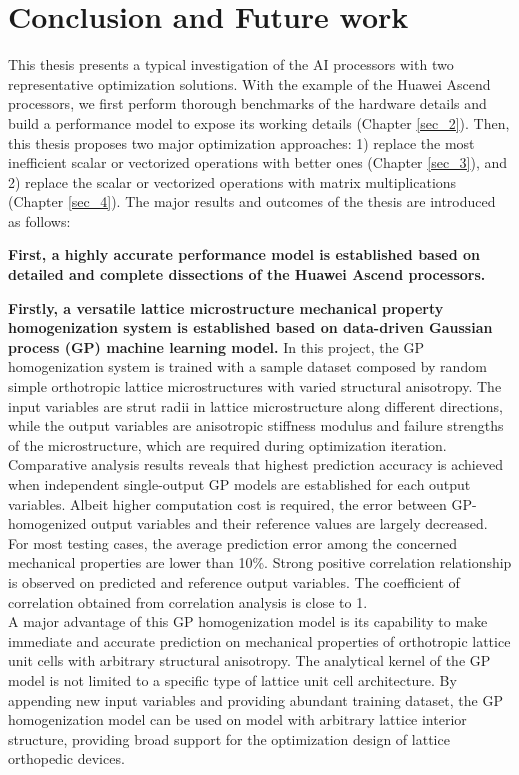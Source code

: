 \documentclass[12pt]{extbook}
\begin{document}
\chapter{Conclusion and Future work}
\label{sec_5}

This thesis presents a typical investigation of the AI processors with two representative optimization solutions. With the example of the Huawei Ascend processors, we first perform thorough benchmarks of the hardware details and build a performance model to expose its working details (Chapter \ref{sec_2}). Then, this thesis proposes two major optimization approaches: 1) replace the most inefficient scalar or vectorized operations with better ones (Chapter \ref{sec_3}), and 2) replace the scalar or vectorized operations with matrix multiplications (Chapter \ref{sec_4}). The major results and outcomes of the thesis are introduced as follows:

\textbf{First, a highly accurate performance model is established based on detailed and complete dissections of the Huawei Ascend processors.} 


{\bf Firstly, a versatile lattice microstructure mechanical property homogenization system is established based on data-driven Gaussian process (GP) machine learning model.} In this project, the GP homogenization system is trained with a sample dataset composed by random simple orthotropic lattice microstructures with varied structural anisotropy. The input variables are strut radii in lattice microstructure along different directions, while the output variables are anisotropic stiffness modulus and failure strengths of the microstructure, which are required during optimization iteration.\\

Comparative analysis results reveals that highest prediction accuracy is achieved when independent single-output GP models are established for each output variables. Albeit higher computation cost is required, the error between GP-homogenized output variables and their reference values are largely decreased. For most testing cases, the average prediction error among the concerned mechanical properties are lower than 10\%. Strong positive correlation relationship is observed on predicted and reference output variables. The coefficient of correlation obtained from correlation analysis is close to 1.\\ 

A major advantage of this GP homogenization model is its capability to make immediate and accurate prediction on mechanical properties of orthotropic lattice unit cells with arbitrary structural anisotropy. The analytical kernel of the GP model is not limited to a specific type of lattice unit cell architecture. By appending new input variables and providing abundant training dataset, the GP homogenization model can be used on model with arbitrary lattice interior structure, providing broad support for the optimization design of lattice orthopedic devices.\\
\end{document}

